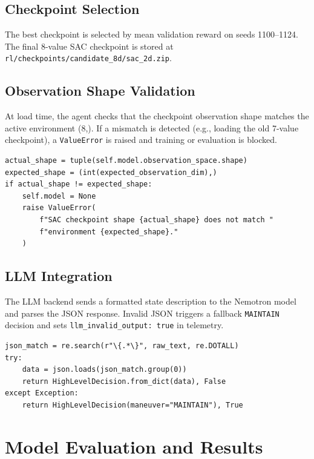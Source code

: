 \documentclass[12pt,a4paper]{report}
\begin{document}
\section{Checkpoint Selection}

The best checkpoint is selected by mean validation reward on seeds 1100--1124. The final 8-value SAC checkpoint is stored at \texttt{rl/checkpoints/candidate\_8d/sac\_2d.zip}.

\section{Observation Shape Validation}

At load time, the agent checks that the checkpoint observation shape matches the active environment (8,). If a mismatch is detected (e.g., loading the old 7-value checkpoint), a \texttt{ValueError} is raised and training or evaluation is blocked.

\begin{lstlisting}[style=python, caption={Shape check in rl\_agent.py}]
actual_shape = tuple(self.model.observation_space.shape)
expected_shape = (int(expected_observation_dim),)
if actual_shape != expected_shape:
    self.model = None
    raise ValueError(
        f"SAC checkpoint shape {actual_shape} does not match "
        f"environment {expected_shape}."
    )
\end{lstlisting}

\section{LLM Integration}

The LLM backend sends a formatted state description to the Nemotron model and parses the JSON response. Invalid JSON triggers a fallback \texttt{MAINTAIN} decision and sets \texttt{llm\_invalid\_output: true} in telemetry.

\begin{lstlisting}[style=python, caption={Output parser fallback (llm/output\_parser.py)}]
json_match = re.search(r"\{.*\}", raw_text, re.DOTALL)
try:
    data = json.loads(json_match.group(0))
    return HighLevelDecision.from_dict(data), False
except Exception:
    return HighLevelDecision(maneuver="MAINTAIN"), True
\end{lstlisting}

\chapter{Model Evaluation and Results}
\end{document}
